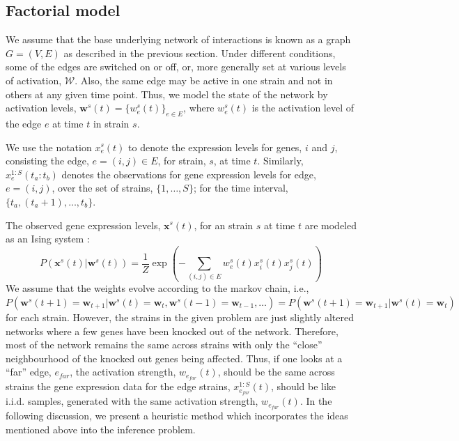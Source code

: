\documentclass{bioinfo}
\begin{document}
\begin{methods}
\subsection{Factorial model}
We assume that the base underlying network of interactions is known as a
graph $G=(V,E)$ as described in the previous section. Under different conditions, some of the edges are 
switched on or off, or, more generally set at various levels of
activation, $\mathcal W$. Also, the same edge may be active in one
strain and not in others at any given time point. Thus, we model the
state of the network by activation levels, $\mathbf{w}^{s}(t) = \{w^s_{e}(t)\}_{e
\in E}$, where $w^s_{e}(t)$ is the activation level of the edge $e$ at time $t$ in strain $s$. 

We use the notation $x^{s}_{e}(t)$ to denote the expression
levels for genes, $i$ and $j$, consisting the edge, $e=(i,j)\in E$,
for strain, $s$, at time $t$. Similarly,  $x_{e}^{1:S}(t_{a}:t_{b})$
denotes the observations for gene expression levels for edge,
$e=(i,j)$, over the set of strains, $\{1,\ldots, S\}$; for the time
interval, $\{t_{a}, (t_{a}+1), \ldots, t_{b}\}$. 

The observed gene expression levels, $\mathbf{x}^{s}(t)$, for an strain
$s$ at time $t$ are modeled as an Ising system \cite{Song09KELLER}:
\begin{equation}
\label{eq:ising}
 P\left(\mathbf{x}^{s}(t) | \mathbf{w}^{s}(t)\right) = 
      \frac{1}{Z} \exp \left( - \sum_{(i,j) \in E} w^s_{e}(t)
        x^{s}_i(t) x^{s}_j(t)\right)  
\end{equation}
We assume that the weights evolve according to the markov chain, i.e.,
$P(\mathbf{w}^{s}(t+1) = \mathbf{w}_{t+1} |  \mathbf{w}^{s}(t) =
  \mathbf{w}_{t}, \mathbf{w}^{s}(t-1) = \mathbf{w}_{t-1},
  \ldots) = P\left(\mathbf{w}^{s}(t+1) = \mathbf{w}_{t+1} |  \mathbf{w}^{s}(t) =
  \mathbf{w}_{t}\right)$ for each strain. 
However, the strains in the given problem are just slightly altered
networks where a few genes have been knocked out of the
network. Therefore, most of the network remains the same across
strains with only the ``close'' neighbourhood of the knocked out genes
being affected. Thus, if one looks at a ``far'' edge,
$e_{far}$, the activation strength, $w_{e_{far}}(t)$, should be the
same across strains  the gene expression data for the edge strains,
$x^{1:S}_{e_{far}}(t)$, should be like i.i.d. samples, generated with
the same activation strength, $w_{e_{far}}(t)$. In the following discussion, 
we present a heuristic method which incorporates the ideas mentioned
above into the inference problem. 

\end{methods}
\end{document}
